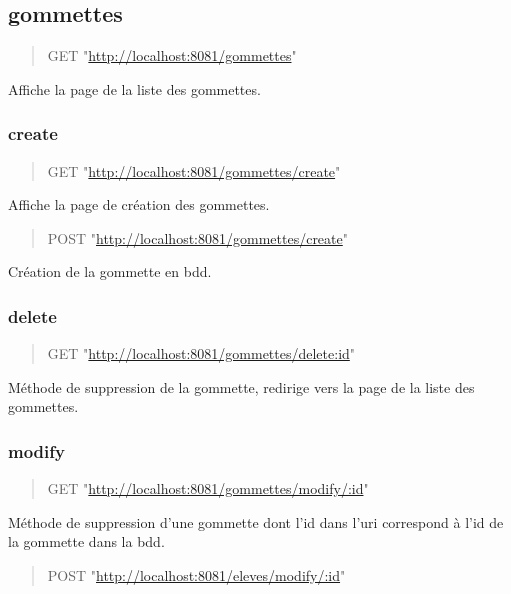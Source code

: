 \documentclass[11pt]{article}
\begin{document}
\subsection{gommettes}
\label{sec:org70398c3}

\begin{quote}
GET "\url{http://localhost:8081/gommettes}"
\end{quote}

Affiche la page de la liste des gommettes.

\subsubsection{create}
\label{sec:org1a91f5b}

\begin{quote}
GET "\url{http://localhost:8081/gommettes/create}"
\end{quote}

Affiche la page de création des gommettes.

\begin{quote}
POST "\url{http://localhost:8081/gommettes/create}"
\end{quote}

Création de la gommette en bdd.

\subsubsection{delete}
\label{sec:org488da5f}

\begin{quote}
GET "\url{http://localhost:8081/gommettes/delete:id}"
\end{quote}

Méthode de suppression de la gommette, redirige vers la page de la liste des gommettes.

\subsubsection{modify}
\label{sec:org9b9f074}

\begin{quote}
GET "\url{http://localhost:8081/gommettes/modify/:id}"
\end{quote}

Méthode de suppression d'une gommette dont l'id dans l'uri correspond à l'id de la gommette dans la bdd.

\begin{quote}
POST "\url{http://localhost:8081/eleves/modify/:id}"
\end{quote}
\end{document}
